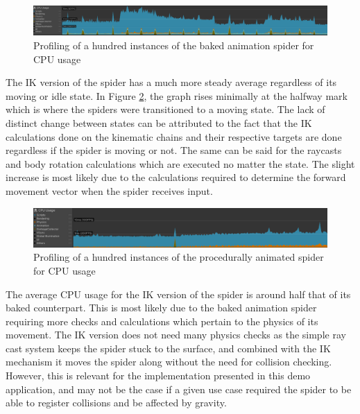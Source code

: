 \begin{figure}[h!]
    \centering
    \captionsetup{justification=centering}
    \includegraphics[width=\textwidth]{grafika/pr_sp_b.png}
    \caption{Profiling of a hundred instances of the baked animation spider for
    CPU usage}
    \label{fig:pr_sp_b}
\end{figure}

The IK version of the spider has a much more steady average regardless of its
moving or idle state. In Figure \ref{fig:pr_sp_ik}, the graph rises minimally at the
halfway mark which is where the spiders were transitioned to a moving state.
The lack of distinct change between states can be attributed to the fact that
the IK calculations done on the kinematic chains and their respective targets
are done regardless if the spider is moving or not. The same can be said for the
raycasts and body rotation calculations which are executed no matter the state.
The slight increase is most likely due to the calculations required to determine
the forward movement vector when the spider receives input. 

\begin{figure}[h!]
    \centering
    \captionsetup{justification=centering}
    \includegraphics[width=\textwidth]{grafika/pr_sp_ik.png}
    \caption{Profiling of a hundred instances of the procedurally animated
    spider for CPU usage}
    \label{fig:pr_sp_ik}
\end{figure}

The average CPU usage for the IK version of the spider is around half that of its
baked counterpart. This is most likely due to the baked animation spider
requiring more checks and calculations which pertain to the physics of its
movement. The IK version does not need many physics checks as the simple ray
cast system keeps the spider stuck to the surface, and combined with the IK
mechanism it moves the spider along without the need for collision checking.
However, this is relevant for the implementation presented in this demo
application, and may not be the case if a given use case required the spider to
be able to register collisions and be affected by gravity.

